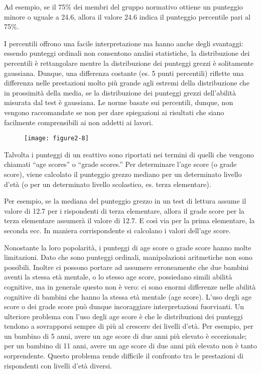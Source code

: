 \begin{exmp}
Ad esempio, se il 75\% dei membri del gruppo normativo ottiene un punteggio minore o uguale a 24.6, allora il valore 24.6 indica il punteggio percentile pari al 75\%.
\end{exmp}
I percentili offrono una facile interpretazione ma hanno anche degli svantaggi:
 essendo punteggi ordinali non consentono analisi statistiche,
 la distribuzione dei percentili è rettangolare mentre la distribuzione dei punteggi grezzi è solitamente gaussiana.
 Dunque, una differenza costante (es. 5 punti percentili) riflette una differenza nelle prestazioni molto più grande agli estremi della distribuzione che in prossimità della media, se la distribuzione dei punteggi grezzi dell'abilità misurata dal test è gaussiana.
   Le norme basate sui percentili, dunque, non vengono raccomandate se non per dare spiegazioni ai risultati che siano facilmente comprensibili ai non addetti ai lavori.
 
\begin{figure}
\begin{center}
\texttt{[image: figure2-8]}
\end{center}
\end{figure}

Talvolta i punteggi di un reattivo sono riportati nei termini di quelli che vengono chiamati ``age scores'' o ``grade scores.''  Per determinare l'age score (o grade score), viene calcolato il punteggio grezzo mediano per un determinato livello d'età (o per un determinato livello scolastico, es. terza elementare).

\begin{exmp}
 Per esempio, se la mediana del punteggio grezzo in un test di lettura assume il valore di 12.7 per i rispondenti di terza elementare, allora il grade score per la terza elementare assumerà il valore di 12.7.  E così via per la prima elementare, la seconda ecc.
In maniera corrispondente si calcolano i valori dell'age score.
\end{exmp}
Nonostante la loro popolarità, i punteggi di age score o grade score hanno molte limitazioni.
 Dato che sono punteggi ordinali,  manipolazioni aritmetiche non sono possibili.
Inoltre ci possono portare ad assumere erroneamente che due bambini aventi la stessa età mentale, o lo stesso age score, possiedano simili abilità cognitive, ma in generale questo non è vero: ci sono enormi differenze nelle abilità cognitive di bambini che hanno la stessa età mentale (age score).
L'uso degli age score o dei grade score può dunque incoraggiare interpretazioni fuorvianti.
Un ulteriore problema con l'uso degli age score è che le distribuzioni dei punteggi tendono a sovrapporsi sempre di più al crescere dei livelli d'età.
     Per esempio, per un bambino di 5 anni, avere un age score di due anni più elevato è eccezionale; per un bambino di 11 anni, avere un age score di due anni più elevato non è tanto sorprendente.
     Questo problema rende difficile il confronto tra le prestazioni di rispondenti con livelli d'età diversi.

